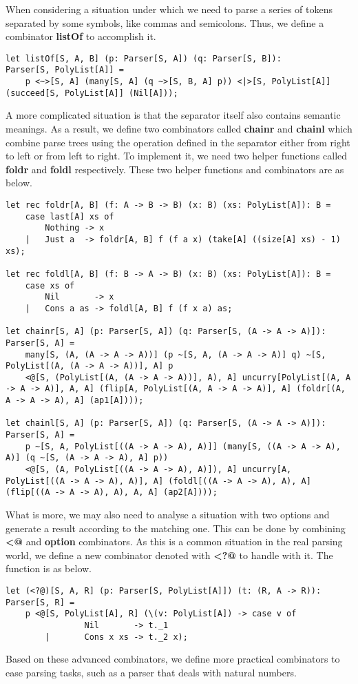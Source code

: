 When considering a situation under which we need to parse a series of tokens separated by some symbols, like commas and semicolons. Thus, we define a combinator \textbf{listOf} to accomplish it.
\begin{lstlisting}
let listOf[S, A, B] (p: Parser[S, A]) (q: Parser[S, B]): 
Parser[S, PolyList[A]] =
    p <~>[S, A] (many[S, A] (q ~>[S, B, A] p)) <|>[S, PolyList[A]] (succeed[S, PolyList[A]] (Nil[A]));
\end{lstlisting}
A more complicated situation is that the separator itself also contains semantic meanings. As a result, we define two combinators called \textbf{chainr} and \textbf{chainl} which combine parse trees using the operation defined in the separator either from right to left or from left to right. To implement it, we need two helper functions called \textbf{foldr} and \textbf{foldl} respectively. These two helper functions and combinators are as below.
\begin{lstlisting}
let rec foldr[A, B] (f: A -> B -> B) (x: B) (xs: PolyList[A]): B =
    case last[A] xs of
        Nothing -> x
    |   Just a  -> foldr[A, B] f (f a x) (take[A] ((size[A] xs) - 1) xs);
    
let rec foldl[A, B] (f: B -> A -> B) (x: B) (xs: PolyList[A]): B =
    case xs of
        Nil       -> x
    |   Cons a as -> foldl[A, B] f (f x a) as;
    
let chainr[S, A] (p: Parser[S, A]) (q: Parser[S, (A -> A -> A)]): 
Parser[S, A] =
    many[S, (A, (A -> A -> A))] (p ~[S, A, (A -> A -> A)] q) ~[S, PolyList[(A, (A -> A -> A))], A] p
    <@[S, (PolyList[(A, (A -> A -> A))], A), A] uncurry[PolyList[(A, A -> A -> A)], A, A] (flip[A, PolyList[(A, A -> A -> A)], A] (foldr[(A, A -> A -> A), A] (ap1[A])));
    
let chainl[S, A] (p: Parser[S, A]) (q: Parser[S, (A -> A -> A)]): 
Parser[S, A] =
    p ~[S, A, PolyList[((A -> A -> A), A)]] (many[S, ((A -> A -> A), A)] (q ~[S, (A -> A -> A), A] p))
    <@[S, (A, PolyList[((A -> A -> A), A)]), A] uncurry[A, PolyList[((A -> A -> A), A)], A] (foldl[((A -> A -> A), A), A] (flip[((A -> A -> A), A), A, A] (ap2[A])));
\end{lstlisting}
What is more, we may also need to analyse a situation with two options and generate a result according to the matching one. This can be done by combining \textbf{<@} and \textbf{option} combinators. As this is a common situation in the real parsing world, we define a new combinator denoted with \textbf{<?@} to handle with it. The function is as below.
\begin{lstlisting}
let (<?@)[S, A, R] (p: Parser[S, PolyList[A]]) (t: (R, A -> R)): Parser[S, R] =
	p <@[S, PolyList[A], R] (\(v: PolyList[A]) -> case v of
			    Nil 	  -> t._1
		|		Cons x xs -> t._2 x);
\end{lstlisting}
Based on these advanced combinators, we define more practical combinators to ease parsing tasks, such as a parser that deals with natural numbers.

